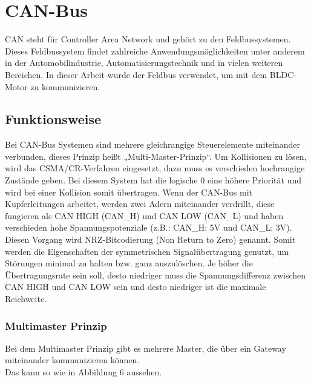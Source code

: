\section{CAN-Bus}
CAN steht für Controller Area Network und gehört zu den Feldbussystemen. Dieses Feldbussystem findet zahlreiche Anwendungsmöglichkeiten unter anderem in der Automobilindustrie, Automatisierungstechnik und in vielen weiteren Bereichen. In dieser Arbeit wurde der Feldbus verwendet, um mit dem BLDC-Motor zu kommunizieren. 

\subsection{Funktionsweise}
Bei CAN-Bus Systemen sind mehrere gleichrangige Steuerelemente miteinander verbunden, dieses Prinzip hei{\ss}t „Multi-Master-Prinzip“. Um Kollisionen zu lösen, wird das CSMA/CR-Verfahren eingesetzt, dazu muss es verschieden hochrangige Zustände geben. Bei diesem System hat die logische 0 eine höhere Priorität und wird bei einer Kollision somit übertragen. Wenn der CAN-Bus mit Kupferleitungen arbeitet, werden zwei Adern miteinander verdrillt, diese fungieren als CAN HIGH (CAN\_H) und CAN LOW (CAN\_L) und haben verschieden hohe Spannungspotenziale (z.B.: CAN\_H: 5V und CAN\_L: 3V). Diesen Vorgang wird NRZ-Bitcodierung (Non Return to Zero) genannt. Somit werden die Eigenschaften der symmetrischen Signalübertragung genutzt, um Störungen minimal zu halten bzw. ganz auszulöschen. Je höher die Übertragungsrate sein soll, desto niedriger muss die Spannungsdifferenz zwischen CAN HIGH und CAN LOW sein und desto niedriger ist die maximale Reichweite. 

\clearpage

\subsubsection{Multimaster Prinzip}
Bei dem Multimaster Prinzip gibt es mehrere Master, die über ein Gateway miteinander kommunizieren können. \\
Das kann so wie in Abbildung 6 aussehen. \\

